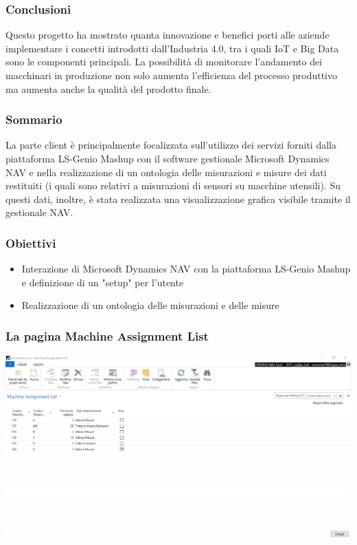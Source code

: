 \documentclass{beamer}
\begin{document}
\begin{frame}
	\frametitle{Conclusioni}
	Questo progetto ha mostrato quanta innovazione e benefici porti alle aziende implementare i concetti introdotti dall’Industria 4.0, tra i quali IoT e Big Data sono le componenti principali. La possibilità di monitorare l'andamento dei macchinari in produzione non solo aumenta l'efficienza del processo produttivo ma aumenta anche la qualità del prodotto finale.
\end{frame}

\begin{frame}
\frametitle{Sommario}
La parte client è principalmente focalizzata sull’utilizzo dei servizi forniti dalla piattaforma LS-Genio Mashup con il software gestionale Microsoft Dynamics NAV e nella realizzazione di un ontologia delle misurazioni e misure dei dati restituiti (i quali sono relativi a misurazioni di sensori su macchine utensili). Su questi dati, inoltre, è stata realizzata una visualizzazione grafica visibile tramite il gestionale NAV.
\end{frame}

\begin{frame}
\frametitle{Obiettivi}
\begin{itemize}
\item Interazione di Microsoft Dynamics NAV con la piattaforma LS-Genio Mashup e definizione di un "setup" per l'utente

\item Realizzazione di un ontologia delle misurazioni e delle misure
\end{itemize}	
\end{frame}

\begin{frame}
\frametitle{La pagina Machine Assignment List}
\includegraphics[width=1\textwidth]{images/MachineAssignmentList2.png}
\end{frame}
\end{document}
